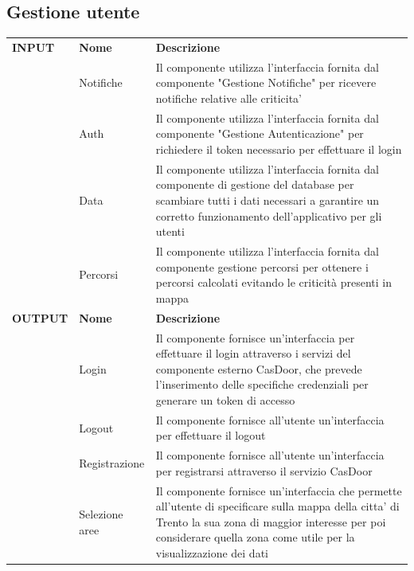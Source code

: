 \documentclass{article}
\begin{document}
\clearpage

\subsection{Gestione utente}

\begin{table}[htbp]
    \centering
    \renewcommand{\arraystretch}{1.3} %
    \begin{tabularx}{\textwidth}{| l | l | X |}
        \Xhline{2pt}
        \textbf{INPUT} & \textbf{Nome} & \textbf{Descrizione} \\
        \Xhline{2pt}
         & Notifiche & Il componente utilizza l'interfaccia fornita dal componente "Gestione Notifiche" per ricevere notifiche relative alle criticita' \\
        \hline
         & Auth & Il componente utilizza l'interfaccia fornita dal componente "Gestione Autenticazione" per richiedere il token necessario per effettuare il login \\
        \hline
         & Data & Il componente utilizza l'interfaccia fornita dal componente di gestione del database per scambiare tutti i dati necessari a garantire un corretto funzionamento dell'applicativo per gli utenti \\
        \hline
         & Percorsi & Il componente utilizza l'interfaccia fornita dal componente gestione percorsi per ottenere i percorsi calcolati evitando le criticità presenti in mappa \\
        \Xhline{2pt}
        \textbf{OUTPUT} & \textbf{Nome} & \textbf{Descrizione} \\
        \Xhline{2pt}
         & Login & Il componente fornisce un'interfaccia per effettuare il login attraverso i servizi del componente esterno CasDoor, che prevede l'inserimento delle specifiche credenziali per generare un token di accesso \\
        \hline
         & Logout & Il componente fornisce all'utente un'interfaccia per effettuare il logout \\
        \hline
         & Registrazione & Il componente fornisce all'utente un'interfaccia per registrarsi attraverso il servizio CasDoor \\
        \hline
         & Selezione aree & Il componente fornisce un'interfaccia che permette all'utente di specificare sulla mappa della citta' di Trento la sua zona di maggior interesse per poi considerare quella zona come utile per la visualizzazione dei dati \\

\end{tabularx}
\end{table}
\end{document}
